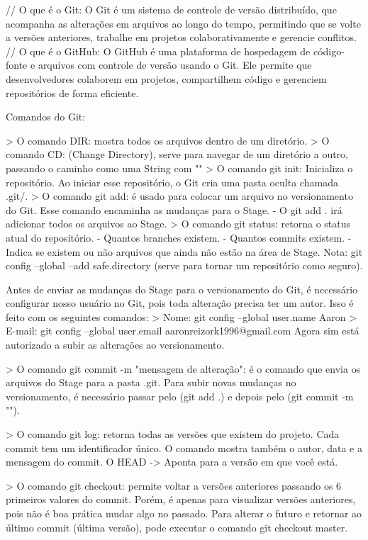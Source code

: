// O que é o Git:
O Git é um sistema de controle de versão distribuído, que acompanha as alterações em arquivos ao longo do tempo, 
permitindo que se volte a versões anteriores, trabalhe em projetos colaborativamente e gerencie conflitos.
// O que é o GitHub:
O GitHub é uma plataforma de hospedagem de código-fonte e arquivos com controle de versão usando o Git. 
Ele permite que desenvolvedores colaborem em projetos, compartilhem código e gerenciem repositórios de forma eficiente.

Comandos do Git:

> O comando DIR: mostra todos os arquivos dentro de um diretório.
> O comando CD: (Change Directory), serve para navegar de um diretório a outro, passando o caminho como uma String com ""
> O comando git init: Inicializa o repositório. Ao iniciar esse repositório, o Git cria uma pasta oculta chamada .git/.
> O comando git add: é usado para colocar um arquivo no versionamento do Git. Esse comando encaminha as mudanças para o Stage.
    - O git add . irá adicionar todos os arquivos ao Stage.
> O comando git status: retorna o status atual do repositório. 
    - Quantos branches existem.
    - Quantos commits existem.
    - Indica se existem ou não arquivos que ainda não estão na área de Stage.
Nota: git config --global --add safe.directory (serve para tornar um repositório como seguro).

Antes de enviar as mudanças do Stage para o versionamento do Git, é necessário configurar nosso
usuário no Git, pois toda alteração precisa ter um autor. Isso é feito com os seguintes comandos:
> Nome: git config --global user.name Aaron
> E-mail: git config --global user.email aaronreizork1996@gmail.com
Agora sim está autorizado a subir as alterações ao versionamento.

> O comando git commit -m "mensagem de alteração": é o comando que envia os arquivos do Stage para a pasta .git.
Para subir novas mudanças no versionamento, é necessário passar pelo (git add .) e depois pelo (git commit -m "").

> O comando git log: retorna todas as versões que existem do projeto. Cada commit tem um identificador
único. O comando mostra também o autor, data e a mensagem do commit. 
O HEAD -> Aponta para a versão em que você está.

> O comando git checkout: permite voltar a versões anteriores passando os 6 primeiros valores do commit.
Porém, é apenas para visualizar versões anteriores, pois não é boa prática mudar algo no passado. Para alterar o futuro e retornar ao último commit (última versão), pode executar o 
comando git checkout master.

